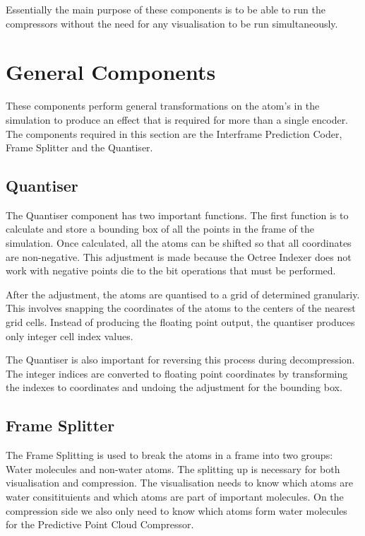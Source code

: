 \documentclass[a4paper,11pt]{report}
\begin{document}
Essentially the main purpose of these components is to be able to run the compressors without the need for any visualisation to be run simultaneously.

\section{General Components}

These components perform general transformations on the atom's in the simulation to produce an effect that is required for more than a single encoder. The components required in this section are the Interframe Prediction Coder, Frame Splitter and the Quantiser.

\subsection{Quantiser}

The Quantiser component has two important functions. The first function is to calculate and store a bounding box of all the points in the frame of the simulation. Once calculated, all the atoms can be shifted so that all coordinates are non-negative. This adjustment is made because the Octree Indexer does not work with negative points die to the bit operations that must be performed.

After the adjustment, the atoms are quantised to a grid of determined granulariy. This involves snapping the coordinates of the atoms to the centers of the nearest grid cells. Instead of producing the floating point output, the quantiser produces only integer cell index values.

The Quantiser is also important for reversing this process during decompression. The integer indices are converted to floating point coordinates by transforming the indexes to coordinates and undoing the adjustment for the bounding box.

\subsection{Frame Splitter}

The Frame Splitting is used to break the atoms in a frame into two groups: Water molecules and non-water atoms. The splitting up is necessary for both visualisation and compression. The visualisation needs to know which atoms are water consitituients and which atoms are part of important molecules. On the compression side we also only need to  know which atoms form water molecules for the Predictive Point Cloud Compressor.
\end{document}
